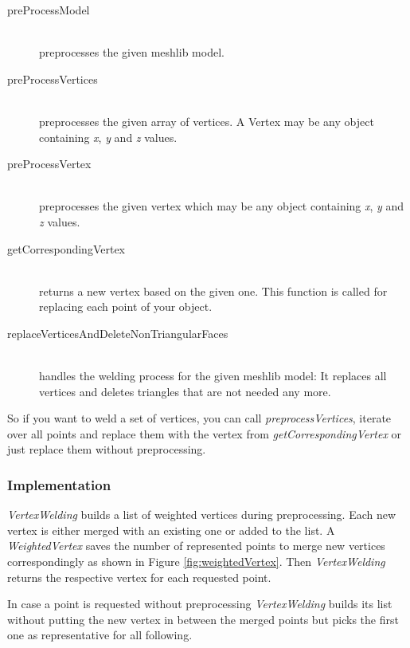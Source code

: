 \documentclass[../ClassicThesis.tex]{subfiles}
\begin{document}
\begin{description}

\item[preProcessModel] \hfill \\
preprocesses the given meshlib model.

\item[preProcessVertices] \hfill \\
preprocesses the given array of vertices. A Vertex may be any object containing \emph{x}, \emph{y} and \emph{z} values.

\item[preProcessVertex] \hfill \\
preprocesses the given vertex which may be any object containing \emph{x}, \emph{y} and \emph{z} values.

\item[getCorrespondingVertex] \hfill \\
returns a new vertex based on the given one. This function is called for replacing each point of your object.

\item[replaceVerticesAndDeleteNonTriangularFaces] \hfill \\
handles the welding process for the given meshlib model: It replaces all vertices and deletes triangles that are not needed any more.

\end{description}

So if you want to weld a set of vertices, you can call \emph{preprocessVertices}, iterate over all points and replace them with the vertex from \emph{getCorrespondingVertex} or just replace them without preprocessing.

\subsubsection{Implementation}


\emph{VertexWelding} builds a list of weighted vertices during preprocessing. Each new vertex is either merged with an existing one or added to the list. A \emph{WeightedVertex} saves the number of represented points to merge new vertices correspondingly as shown in Figure \ref{fig:weightedVertex}. Then \emph{VertexWelding} returns the respective vertex for each requested point. 

In case a point is requested without preprocessing \emph{VertexWelding} builds its list without putting the new vertex in between the merged points but picks the first one as representative for all following.
\end{document}
